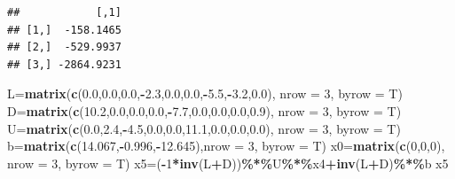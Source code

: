 \documentclass[
]{article}
\newenvironment{Shaded}{\begin{snugshade}}{\end{snugshade}}
\newcommand{\AttributeTok}[1]{\textcolor[rgb]{0.13,0.29,0.53}{#1}}
\newcommand{\DecValTok}[1]{\textcolor[rgb]{0.00,0.00,0.81}{#1}}
\newcommand{\FloatTok}[1]{\textcolor[rgb]{0.00,0.00,0.81}{#1}}
\newcommand{\FunctionTok}[1]{\textcolor[rgb]{0.13,0.29,0.53}{\textbf{#1}}}
\newcommand{\NormalTok}[1]{#1}
\newcommand{\OtherTok}[1]{\textcolor[rgb]{0.56,0.35,0.01}{#1}}
\newcommand{\SpecialCharTok}[1]{\textcolor[rgb]{0.81,0.36,0.00}{\textbf{#1}}}
\begin{document}
\begin{verbatim}
##            [,1]
## [1,]  -158.1465
## [2,]  -529.9937
## [3,] -2864.9231
\end{verbatim}

\begin{Shaded}
\begin{Highlighting}[]
\NormalTok{  L}\OtherTok{=}\FunctionTok{matrix}\NormalTok{(}\FunctionTok{c}\NormalTok{(}\FloatTok{0.0}\NormalTok{,}\FloatTok{0.0}\NormalTok{,}\FloatTok{0.0}\NormalTok{,}\SpecialCharTok{{-}}\FloatTok{2.3}\NormalTok{,}\FloatTok{0.0}\NormalTok{,}\FloatTok{0.0}\NormalTok{,}\SpecialCharTok{{-}}\FloatTok{5.5}\NormalTok{,}\SpecialCharTok{{-}}\FloatTok{3.2}\NormalTok{,}\FloatTok{0.0}\NormalTok{), }\AttributeTok{nrow =} \DecValTok{3}\NormalTok{, }\AttributeTok{byrow =}\NormalTok{ T)}
\NormalTok{  D}\OtherTok{=}\FunctionTok{matrix}\NormalTok{(}\FunctionTok{c}\NormalTok{(}\FloatTok{10.2}\NormalTok{,}\FloatTok{0.0}\NormalTok{,}\FloatTok{0.0}\NormalTok{,}\FloatTok{0.0}\NormalTok{,}\SpecialCharTok{{-}}\FloatTok{7.7}\NormalTok{,}\FloatTok{0.0}\NormalTok{,}\FloatTok{0.0}\NormalTok{,}\FloatTok{0.0}\NormalTok{,}\FloatTok{0.9}\NormalTok{), }\AttributeTok{nrow =} \DecValTok{3}\NormalTok{, }\AttributeTok{byrow =}\NormalTok{ T)}
\NormalTok{  U}\OtherTok{=}\FunctionTok{matrix}\NormalTok{(}\FunctionTok{c}\NormalTok{(}\FloatTok{0.0}\NormalTok{,}\FloatTok{2.4}\NormalTok{,}\SpecialCharTok{{-}}\FloatTok{4.5}\NormalTok{,}\FloatTok{0.0}\NormalTok{,}\FloatTok{0.0}\NormalTok{,}\FloatTok{11.1}\NormalTok{,}\FloatTok{0.0}\NormalTok{,}\FloatTok{0.0}\NormalTok{,}\FloatTok{0.0}\NormalTok{), }\AttributeTok{nrow =} \DecValTok{3}\NormalTok{, }\AttributeTok{byrow =}\NormalTok{ T)}
\NormalTok{  b}\OtherTok{=}\FunctionTok{matrix}\NormalTok{(}\FunctionTok{c}\NormalTok{(}\FloatTok{14.067}\NormalTok{,}\SpecialCharTok{{-}}\FloatTok{0.996}\NormalTok{,}\SpecialCharTok{{-}}\FloatTok{12.645}\NormalTok{),}\AttributeTok{nrow =} \DecValTok{3}\NormalTok{, }\AttributeTok{byrow =}\NormalTok{ T)}
\NormalTok{  x0}\OtherTok{=}\FunctionTok{matrix}\NormalTok{(}\FunctionTok{c}\NormalTok{(}\DecValTok{0}\NormalTok{,}\DecValTok{0}\NormalTok{,}\DecValTok{0}\NormalTok{), }\AttributeTok{nrow =} \DecValTok{3}\NormalTok{, }\AttributeTok{byrow =}\NormalTok{ T)}
\NormalTok{  x5}\OtherTok{=}\NormalTok{(}\SpecialCharTok{{-}}\DecValTok{1}\SpecialCharTok{*}\FunctionTok{inv}\NormalTok{(L}\SpecialCharTok{+}\NormalTok{D))}\SpecialCharTok{\%*\%}\NormalTok{U}\SpecialCharTok{\%*\%}\NormalTok{x4}\SpecialCharTok{+}\FunctionTok{inv}\NormalTok{(L}\SpecialCharTok{+}\NormalTok{D)}\SpecialCharTok{\%*\%}\NormalTok{b}
\NormalTok{  x5}
\end{Highlighting}
\end{Shaded}
\end{document}
